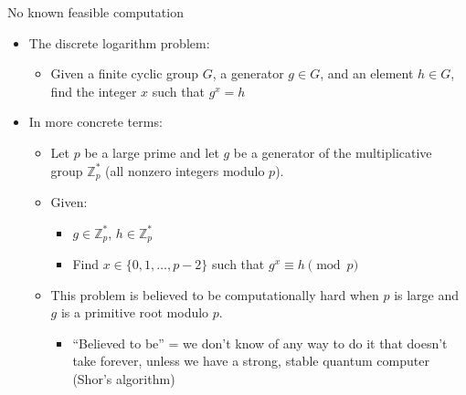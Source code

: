 \ifdefined\PRESENTATION\else\PassOptionsToClass{handout}{beamer}\fi\documentclass[aspectratio=169, lualatex]{beamer}
\begin{document}
\begin{frame}{No known feasible computation}
	\begin{itemize}[<+->]
		\item The discrete logarithm problem:
		      \begin{itemize}
			      \item Given a finite cyclic group $G$, a generator $g \in G$, and an element
			            $h \in G$, find the integer $x$ such that $g^{x}=h$
		      \end{itemize}
		\item In more concrete terms:
		      \begin{itemize}
			      \item Let $p$ be a large prime and let $g$ be a generator of the multiplicative
			            group $\mathbb{Z}_{p}^{*}$ (all nonzero integers modulo $p$).

			      \item Given:
			            \begin{itemize}
				            \item $g \in \mathbb{Z}_{p}^{*}$, $h \in \mathbb{Z}_{p}^{*}$

				            \item Find $x \in \{0, 1, \ldots, p-2\}$ such that $g^{x} \equiv h \pmod
					                  {p}$
			            \end{itemize}

			      \item This problem is believed to be computationally hard when $p$ is large
			            and $g$ is a primitive root modulo $p$.
			            \begin{itemize}
				            \item ``Believed to be'' = we don't know of any way to do it that doesn't
				                  take forever, unless we have a strong, stable quantum computer (Shor's
				                  algorithm)
			            \end{itemize}
		      \end{itemize}
	\end{itemize}
\end{frame}
\end{document}
